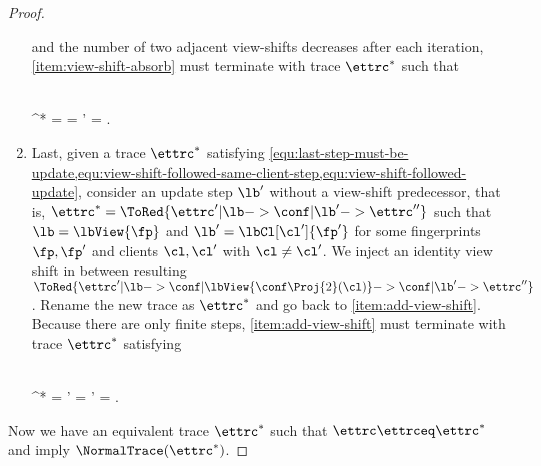 \begin{proof}
\begin{enumerate}
    and the number of two adjacent view-shifts decreases after each iteration,
    \cref{item:view-shift-absorb} must terminate with trace \( \ettrc^* \) such that
    \begin{Formulae}
    \begin{Formula}
    \\ \ettrc^* =  
    \land \lb = \lbView{\vi}
    \implies \Exists{\fp \in \Fingerprints}
    \lb' = \lbFp{\fp}.
    \label{equ:view-shift-followed-update}
    \end{Formula}
    \end{Formulae}
\item \label{item:add-view-shift} 
    Last, given a trace \( \ettrc^* \) satisfying 
    \cref{equ:last-step-must-be-update,equ:view-shift-followed-same-client-step,equ:view-shift-followed-update},
    consider an update step \( \lb' \) without a view-shift predecessor,
    that is, \( \ettrc^* =  \ToRed{\ettrc' | \lb -> \conf | \lb' -> \ettrc''} \) 
    such that \( \lb = \lbView{\fp} \) and \( \lb' = \lbCl[\cl']{\fp'} \)
    for some fingerprints \( \fp,\fp'\) and 
    clients \( \cl, \cl' \) with \( \cl \neq \cl' \).
    We inject an identity view shift in between resulting 
    \(  \ToRed{\ettrc' | \lb -> \conf | \lbView{\conf\Proj{2}(\cl)} -> \conf | \lb' -> \ettrc''} \).
    Rename the new trace as \( \ettrc^* \) and go back to \cref{item:add-view-shift}.
    Because there are only finite steps, \cref{item:add-view-shift} must 
    terminate with trace \( \ettrc^* \) satisfying 
    \begin{Formulae}
    \begin{Formula}
    \\ \ettrc^* =  
    \land \lb' = \lbFp{\fp}
    \implies \Exists{\vi \in \Views}
    \lb' = \lbView{\vi}.
    \label{equ:update-impede-view}
    \end{Formula}
    \end{Formulae}
\end{enumerate}
Now we have an equivalent trace \( \ettrc^* \) such that \( \ettrc \ettrceq \ettrc^* \) 
and  imply \( \NormalTrace(\ettrc^*) \).
\end{proof}
